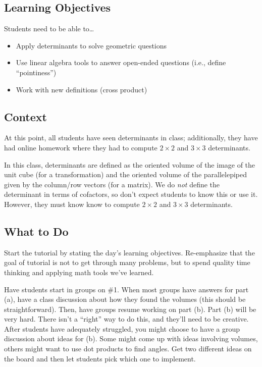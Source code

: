 \subsection*{Learning Objectives}	
Students need to be able to\ldots
	\begin{itemize}
		\item Apply determinants to solve geometric questions
		\item Use linear algebra tools to answer open-ended questions (i.e., define ``pointiness'')
		\item Work with new definitions (cross product)
	\end{itemize}

\subsection*{Context}
	At this point, all students have seen determinants in class; additionally, they have had online homework
		where they had to compute $2\times 2$ and $3\times 3$ determinants.

		In this class, determinants are defined as the oriented volume of the image of the unit cube (for a
		transformation) and the oriented volume of the parallelepiped given by the column/row vectors
		(for a matrix). We do \emph{not} define the determinant in terms of cofactors, so don't expect students
		to know this or use it. However, they must know know to compute $2\times 2$ and $3\times 3$ determinants.

\subsection*{What to Do}
	Start the tutorial by stating the day's learning objectives. Re-emphasize that the goal
		of tutorial is not to get through many problems, but to spend quality time thinking
		and applying math tools we've learned.

		Have students start in groups on \#1. When most groups have answers for part (a),
		have a class discussion about how they found the volumes (this should be straightforward). Then,
		have groups resume working on part (b). Part (b) will be very hard. There isn't a ``right'' way
		to do this,
		and they'll need to be creative. After students have adequately struggled, you might choose
		to have a group discussion about ideas for (b). Some might come up with ideas involving volumes,
		others might want to use dot products to find angles. Get two different ideas on the board and then
		let students pick which one to implement.

